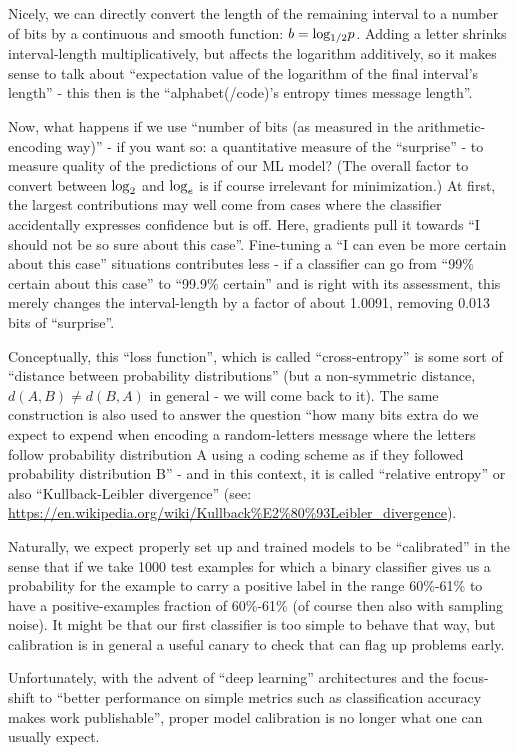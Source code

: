 \documentclass[11pt]{article}
\begin{document}
Nicely, we can directly convert the length of the remaining interval to
a number of bits by a continuous and smooth function:
\(b={\rm log_{1/2}} p\). Adding a letter shrinks interval-length
multiplicatively, but affects the logarithm additively, so it makes
sense to talk about ``expectation value of the logarithm of the final
interval's length'' - this then is the ``alphabet(/code)'s entropy times
message length''.

Now, what happens if we use ``number of bits (as measured in the
arithmetic-encoding way)'' - if you want so: a quantitative measure of
the ``surprise'' - to measure quality of the predictions of our ML
model? (The overall factor to convert between \({\rm log}_2\) and
\({\rm log}_e\) is if course irrelevant for minimization.) At first, the
largest contributions may well come from cases where the classifier
accidentally expresses confidence but is off. Here, gradients pull it
towards ``I should not be so sure about this case''. Fine-tuning a ``I
can even be more certain about this case'' situations contributes less -
if a classifier can go from ``99\% certain about this case'' to ``99.9\%
certain'' and is right with its assessment, this merely changes the
interval-length by a factor of about 1.0091, removing 0.013 bits of
``surprise''.

Conceptually, this ``loss function'', which is called ``cross-entropy''
is some sort of ``distance between probability distributions'' (but a
non-symmetric distance, \(d(A,B)\neq d(B,A)\) in general - we will come
back to it). The same construction is also used to answer the question
``how many bits extra do we expect to expend when encoding a
random-letters message where the letters follow probability distribution
A using a coding scheme as if they followed probability distribution B''
- and in this context, it is called ``relative entropy'' or also
``Kullback-Leibler divergence'' (see:
\url{https://en.wikipedia.org/wiki/Kullback\%E2\%80\%93Leibler_divergence}).

Naturally, we expect properly set up and trained models to be
``calibrated'' in the sense that if we take 1000 test examples for which
a binary classifier gives us a probability for the example to carry a
positive label in the range 60\%-61\% to have a positive-examples
fraction of 60\%-61\% (of course then also with sampling noise). It
might be that our first classifier is too simple to behave that way, but
calibration is in general a useful canary to check that can flag up
problems early.

Unfortunately, with the advent of ``deep learning'' architectures and
the focus-shift to ``better performance on simple metrics such as
classification accuracy makes work publishable'', proper model
calibration is no longer what one can usually expect.
\end{document}

